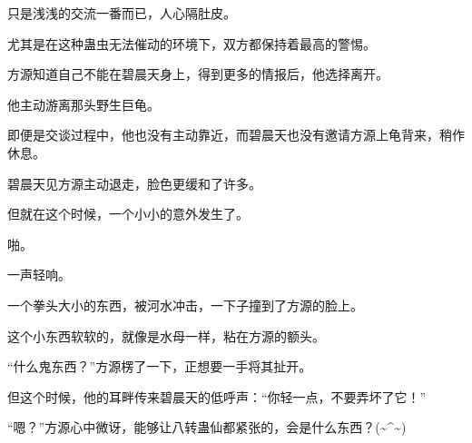 \begin{this_body}
只是浅浅的交流一番而已，人心隔肚皮。

尤其是在这种蛊虫无法催动的环境下，双方都保持着最高的警惕。

方源知道自己不能在碧晨天身上，得到更多的情报后，他选择离开。

他主动游离那头野生巨龟。

即便是交谈过程中，他也没有主动靠近，而碧晨天也没有邀请方源上龟背来，稍作休息。

碧晨天见方源主动退走，脸色更缓和了许多。

但就在这个时候，一个小小的意外发生了。

啪。

一声轻响。

一个拳头大小的东西，被河水冲击，一下子撞到了方源的脸上。

这个小东西软软的，就像是水母一样，粘在方源的额头。

“什么鬼东西？”方源楞了一下，正想要一手将其扯开。

但这个时候，他的耳畔传来碧晨天的低呼声：“你轻一点，不要弄坏了它！”

“嗯？”方源心中微讶，能够让八转蛊仙都紧张的，会是什么东西？(\~{}\^{}\~{})

\end{this_body}

